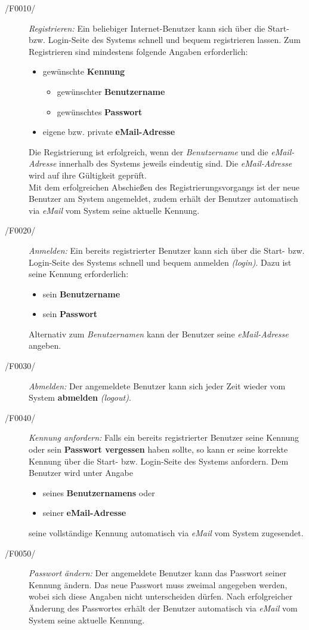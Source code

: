 \begin{description}
  \item[/F0010/]
    \textit{Registrieren:} Ein beliebiger Internet-Benutzer kann sich über die Start- bzw. Login-Seite des Systems
    schnell und bequem registrieren lassen. Zum Registrieren sind mindestens folgende Angaben erforderlich:
    \begin{itemize}
      \item gewünschte \textbf{Kennung}
        \begin{itemize}
          \item gewünschter \textbf{Benutzername}
          \item gewünschtes \textbf{Passwort}
        \end{itemize}
      \item eigene bzw. private \textbf{eMail-Adresse}
    \end{itemize}
    Die Registrierung ist erfolgreich, wenn der \textit{Benutzername} und die \textit{eMail-Adresse}
    innerhalb des Systems jeweils eindeutig sind. Die \textit{eMail-Adresse} wird auf ihre Gültigkeit geprüft.\\
    Mit dem erfolgreichen Abschießen des Registrierungsvorgangs ist der neue Benutzer am System angemeldet,
    zudem erhält der Benutzer automatisch via \textit{eMail} vom System seine aktuelle Kennung.
  \item[/F0020/]
    \textit{Anmelden:} Ein bereits registrierter Benutzer kann sich über die Start- bzw. Login-Seite des Systems
    schnell und bequem anmelden \textit{(login)}. Dazu ist seine Kennung erforderlich:
    \begin{itemize}
      \item sein \textbf{Benutzername}
      \item sein \textbf{Passwort}
    \end{itemize}
    Alternativ zum \textit{Benutzernamen} kann der Benutzer seine \textit{eMail-Adresse} angeben.
  \item[/F0030/]
    \textit{Abmelden:} Der angemeldete Benutzer kann sich jeder Zeit wieder vom System \textbf{abmelden} \textit{(logout)}.
  \item[/F0040/]
    \textit{Kennung anfordern:} Falls ein bereits registrierter Benutzer seine Kennung oder sein \textbf{Passwort vergessen}
    haben sollte, so kann er seine korrekte Kennung über die Start- bzw. Login-Seite des Systems anfordern.
    Dem Benutzer wird unter Angabe
    \begin{itemize}
      \item seines \textbf{Benutzernamens} oder
      \item seiner \textbf{eMail-Adresse}
    \end{itemize}
    seine vollständige Kennung automatisch via \textit{eMail} vom System zugesendet.
  \item[/F0050/]
    \textit{Passwort ändern:} Der angemeldete Benutzer kann das Passwort seiner Kennung ändern.
    Das neue Passwort muss zweimal angegeben werden, wobei sich diese Angaben nicht unterscheiden dürfen.
    Nach erfolgreicher Änderung des Passwortes erhält der Benutzer automatisch via \textit{eMail} vom System seine aktuelle Kennung.
\end{description}

